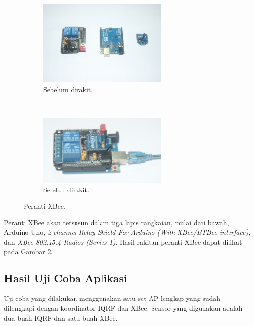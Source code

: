 			\begin{figure}[H]
				\begin{subfigure}[b]{\textwidth}
					\centering
				    \includegraphics[width=0.7\textwidth]{gambar/xbee-stripped}
				    \caption{Sebelum dirakit.}
				    \label{xbee-stripped}
				\end{subfigure}
				 ~
				\begin{subfigure}[b]{\textwidth}
					\centering
				    \includegraphics[width=0.7\textwidth]{gambar/xbee-complete}
				    \caption{Setelah dirakit.}
				    \label{xbee-complete}
				\end{subfigure}
				\caption{Peranti XBee.}
				\label{xbee-relay}
			\end{figure}

			Peranti XBee akan tersusun dalam tiga lapis rangkaian, mulai dari bawah, Arduino Uno, \emph{2 channel Relay Shield For Arduino (With XBee/BTBee interface)}, dan \emph{XBee 802.15.4 Radios (Series 1)}. Hasil rakitan peranti XBee dapat dilihat pada Gambar \ref{xbee-complete}.

		\subsection{Hasil Uji Coba Aplikasi}
			Uji coba yang dilakukan menggunakan satu set AP lengkap yang sudah dilengkapi dengan koordinator IQRF dan XBee. Sensor yang digunakan adalah dua buah IQRF dan satu buah XBee.


